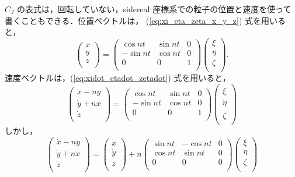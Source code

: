 \documentclass[11pt,a4paper,oneside,onecolumn]{jarticle}
\begin{document}
$C_J$ の表式は，回転していない，sidereal 座標系での粒子の位置と速度を使って書くこともできる．位置ベクトルは， (\ref{eq:xi_eta_zeta_x_y_z}) 式を用いると，
\begin{equation}
\begin{pmatrix}
x\\
y\\
z\\
\end{pmatrix}
= 
\begin{pmatrix}
\cos nt & \sin nt & 0\\
- \sin nt & \cos nt & 0\\
0 & 0 & 1\\
\end{pmatrix}
\begin{pmatrix}
\xi\\
\eta\\
\zeta\\
\end{pmatrix}. \label{eq:x_y_z_xi_eta_zeta}
\end{equation}
速度ベクトルは，(\ref{eq:xidot_etadot_zetadot}) 式を用いると，
\begin{equation}
\begin{pmatrix}
\dot{x} - ny\\
\dot{y} + nx\\
\dot{z}\\
\end{pmatrix}
= 
\begin{pmatrix}
\cos nt & \sin nt & 0\\
- \sin nt & \cos nt & 0\\
0 & 0 & 1\\
\end{pmatrix}
\begin{pmatrix}
\dot{\xi}\\
\dot{\eta}\\
\dot{\zeta}\\
\end{pmatrix} \label{eq:xdot_ydot_zdot_1}
\end{equation}
しかし，
\begin{equation}
\begin{pmatrix}
\dot{x} - ny\\
\dot{y} + nx\\
\dot{z}\\
\end{pmatrix}
= 
\begin{pmatrix}
\dot{x}\\
\dot{y}\\
\dot{z}\\
\end{pmatrix}
+ n
\begin{pmatrix}
\sin nt & - \cos nt & 0\\
\cos nt & \sin nt & 0\\
0 & 0 & 0\\
\end{pmatrix}
\begin{pmatrix}
\xi\\
\eta\\
\zeta\\
\end{pmatrix} \label{eq:xdot_ydot_zdot_2}
\end{equation}
\end{document}
